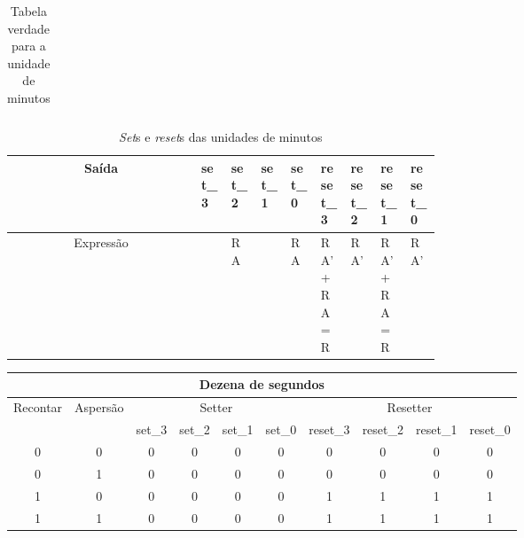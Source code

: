 \documentclass[
	article,			%
	11pt,				%
	oneside,			%
	a4paper,			%
	english,			%
	brazil,				%
	sumario=tradicional
	]{abntex2}
\begin{document}
\begin{itemize}
\begin{table}[H]
\begin{tabular}{| c  |c  |c  |c |c |c  |c  |c |c |c |}
\end{tabular}
\caption{Tabela verdade para a unidade de minutos}
\label{tab:my_table}
\end{table}
\begin{table}[H]
    \centering
    \begin{tabular}{|c|>{\centering\arraybackslash}p{0.07\linewidth}|>{\centering\arraybackslash}p{0.07\linewidth}|>{\centering\arraybackslash}p{0.07\linewidth}|>{\centering\arraybackslash}p{0.07\linewidth}|>{\centering\arraybackslash}p{0.07\linewidth}|>{\centering\arraybackslash}p{0.07\linewidth}|>{\centering\arraybackslash}p{0.07\linewidth}|>{\centering\arraybackslash}p{0.07\linewidth}|} \hline 
          Saída&set_3&  set_2&  set_1&  set_0&  reset_3&  reset_2&  reset_1& reset_0\\ \hline 
          Expressão&0&  RA&  0&  RA&  RA' + RA
=
R&  RA'&  RA' + RA
=
R& RA'\\ \hline
    \end{tabular}
    \caption{\textit{Set}s e \textit{reset}s das unidades de minutos}
    \label{tab:my_label}
\end{table}
\begin{table}[H]
\centering

\begin{tabular}{| c  |c  |c  |c |c |c  |c  |c |c |c |}
\hline
\multicolumn{10}{|c|}{Dezena de segundos} \\
\hline
Recontar& Aspersão& \multicolumn{4}{|c|}{Setter} & \multicolumn{4}{|c|}{Resetter} \\
\hline
 &  & set_3& set_2& set_1& set_0& reset_3& reset_2& reset_1& reset_0\\ \hline 
0 & 0 & 0 & 0 & 0 & 0 & 0 & 0 & 0 & 0 \\ \hline 
0 & 1 & 0 & 0 & 0 & 0 & 0 & 0 & 0 & 0 \\ \hline 
1 & 0 & 0 & 0 & 0 & 0 & 1 & 1 & 1 & 1 \\ \hline
1 & 1 & 0 & 0 & 0 & 0 & 1 & 1 & 1 & 1 \\ \hline


\end{tabular}
\end{table}
\end{itemize}
\end{document}
